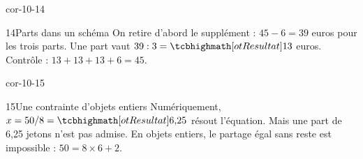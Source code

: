 \begin{blocLivre}{cor-10-14}\begin{corrige}{14}{Parts dans un schéma}
On retire d’abord le supplément : $45-6=39$ euros pour les trois parts. Une part vaut $39:3=\res{13}$ euros. Contrôle : $13+13+13+6=45$.
\label{fig-cor-10-14}
\end{corrige}\end{blocLivre}
\begin{blocLivre}{cor-10-15}\begin{corrige}{15}{Une contrainte d’objets entiers}
Numériquement, $x=50/8=\res{6{,}25}$ résout l’équation. Mais une part de 6,25 jetons n’est pas admise. En objets entiers, le partage égal sans reste est impossible : $50=8\times6+2$.
\end{corrige}\end{blocLivre}
